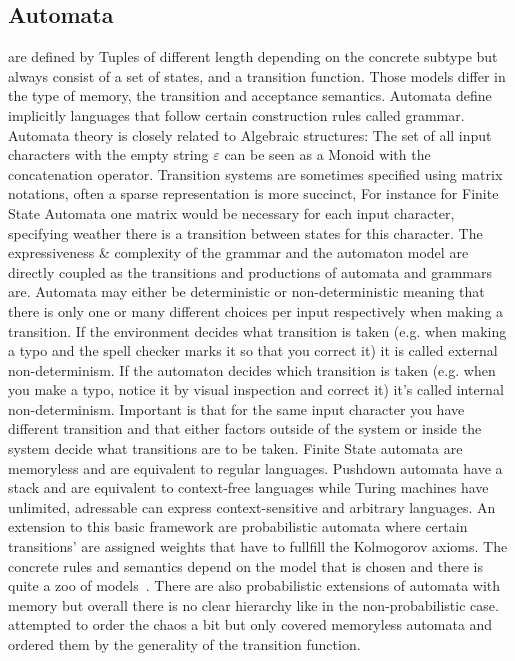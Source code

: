 \documentclass[11pt, rgb]{scrartcl}
\begin{document}
\subsection{Automata} are defined by Tuples of different length depending on the concrete subtype but always consist of a set of states, and a transition function. 
Those models differ in the type of memory, the transition and acceptance semantics.
Automata define implicitly languages that follow certain construction rules called grammar. 
Automata theory is closely related to Algebraic structures: 
The set of all input characters with the empty string $\varepsilon$ can be seen as a Monoid with the concatenation operator.
Transition systems are sometimes specified using matrix notations, often a sparse representation is more succinct,
For instance for Finite State Automata one matrix would be necessary for each input character, specifying weather there is a transition between states for this character.
The expressiveness \& complexity of the grammar and the automaton model are directly coupled as the transitions and productions of automata and grammars are. 
Automata may either be deterministic or non-deterministic meaning that there is only one or many different choices per input respectively when making a transition. 
If the environment decides what transition is taken (e.g. when making a typo and the spell checker marks it so that you correct it) it is called external non-determinism. 
If the automaton decides which transition is taken (e.g. when you make a typo, notice it by visual inspection and correct it) it's called internal non-determinism. 
Important is that for the same input character you have different transition and that either factors outside of the system or inside the system decide what transitions are to be taken. 
Finite State automata are memoryless and are equivalent to regular languages. 
Pushdown automata have a stack and are equivalent to context-free languages while Turing machines have unlimited, adressable can express context-sensitive and arbitrary languages.
An extension to this basic framework are probabilistic automata where certain transitions' are assigned weights that have to fullfill the Kolmogorov axioms.
The concrete rules and semantics depend on the model that is chosen and there is quite a zoo of models~\autocite{sokolova}.
There are also probabilistic extensions of automata with memory but overall there is no clear hierarchy like in the non-probabilistic case. 
\autocite{sokolova} attempted to order the chaos a bit but only covered memoryless automata and ordered them by the generality of the transition function. 
\end{document}
